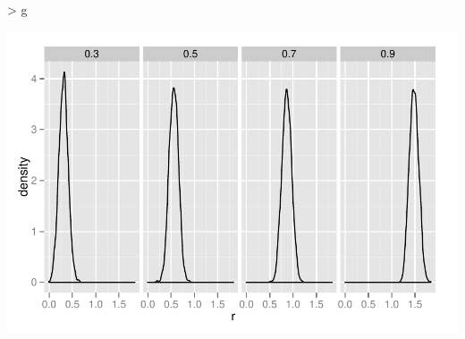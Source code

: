 \begin{Schunk}
\begin{Sinput}
> g %
\end{Sinput}
\end{Schunk}
\includegraphics{sim_correlation-009}






